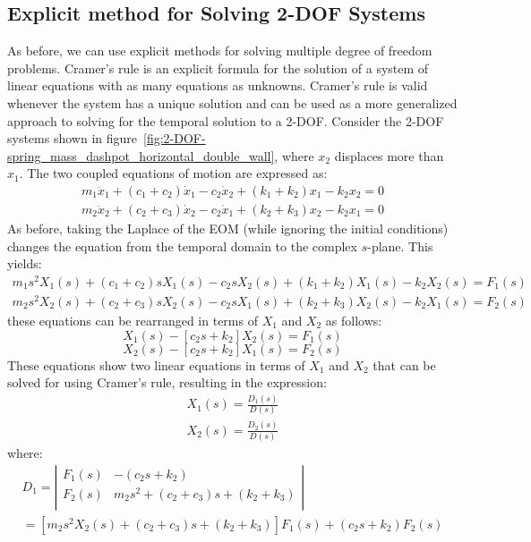 \documentclass[12pt,letter]{article}
\begin{document}
	
	
	\subsection{Explicit method for Solving 2-DOF Systems}
	
	

	
	
	As before, we can use explicit methods for solving multiple degree of freedom problems. 
	Cramer's rule is an explicit formula for the solution of a system of linear equations with as many equations as unknowns. Cramer's rule is valid whenever the system has a unique solution and can be used as a more generalized approach to solving for the temporal solution to a 2-DOF. Consider the 2-DOF systems shown in figure~\ref{fig:2-DOF-spring_mass_dashpot_horizontal_double_wall}, where $x_2$ displaces more than $x_1$. The two coupled equations of motion are expressed as: 
	\begin{eqnarray}
	m_1\ddot{x}_1 + (c_1+c_2)\dot{x}_1 - c_2\dot{x}_2 + (k_1+k_2)x_1 - k_2x_2 =0 \\
	m_2\ddot{x}_2 + (c_2+c_3)\dot{x}_2 - c_2\dot{x}_1 + (k_2+k_3)x_2 - k_2x_1 =0 \nonumber
	\end{eqnarray}
	As before, taking the Laplace of the EOM (while ignoring the initial conditions) changes the equation from the temporal domain to the complex $s$-plane. This yields:
	\begin{eqnarray}
	m_1 s^2 X_1(s) + (c_1 + c_2)sX_1(s) - c_2sX_2(s) + (k_1+k_2)X_1(s) - k_2X_2(s) = F_1(s) \\
	m_2 s^2 X_2(s) + (c_2 + c_3)sX_2(s) - c_2sX_1(s) + (k_2+k_3)X_2(s) - k_2X_1(s) = F_2(s) \nonumber
	\end{eqnarray}
	these equations can be rearranged in terms of $X_1$ and $X_2$ as follows:
	\begin{equation}
	[m_1 s^2 + (c_1 + c_2)s + (k_1+k_2)]X_1(s) - [c_2s+k_2]X_2(s) = F_1(s) 
	\end{equation}
	\begin{equation}
	[m_2 s^2 + (c_2 + c_3)s + (k_2+k_3)]X_2(s) - [c_2s+k_2]X_1(s) = F_2(s) \nonumber
	\end{equation}
	These equations show two linear equations in terms of $X_1$ and $X_2$ that can be solved for using Cramer's rule, resulting in the expression:
			\vspace{-1ex}	
	\begin{eqnarray}
	X_1(s) = \frac{D_1(s)}{D(s)} \\
	X_2(s) = \frac{D_2(s)}{D(s)} \nonumber
	\end{eqnarray}
		\vspace{-1ex}	
	where:
		\vspace{-1ex}	
	\begin{eqnarray}
	D_1 = \left|
	\begin{array}{cc}
	F_1(s)  & -(c_2s+k_2) \\
	F_2(s)  & m_2 s^2 + (c_2 + c_3)s + (k_2+k_3) \\
	\end{array}
	\right| \\
	= [m_2 s^2 X_2(s) + (c_2 + c_3)s +(k_2+k_3)]F_1(s) + (c_2s+k_2)F_2(s)  \nonumber
	\end{eqnarray}
\end{document}
